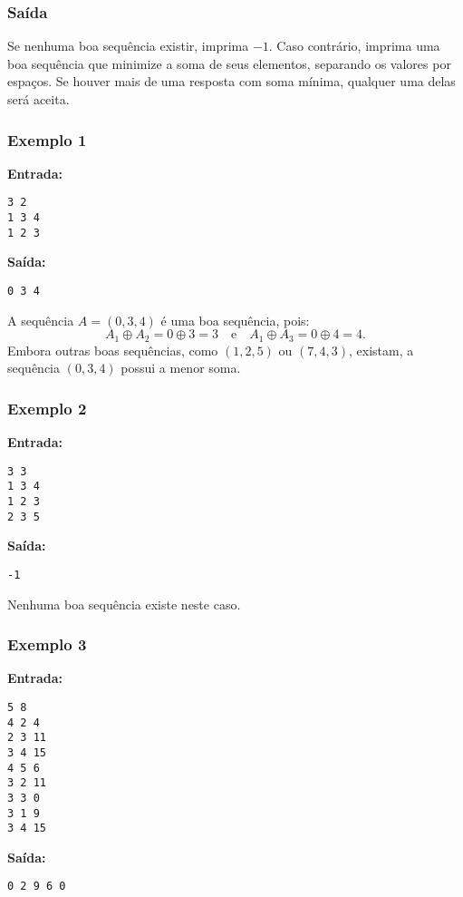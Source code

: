 \subsubsection*{Saída}
Se nenhuma boa sequência existir, imprima \(-1\). Caso contrário, imprima uma boa sequência que minimize a soma de seus elementos, separando os valores por espaços. Se houver mais de uma resposta com soma mínima, qualquer uma delas será aceita.

\subsubsection*{Exemplo 1}
\textbf{Entrada:}
\begin{verbatim}
3 2
1 3 4
1 2 3
\end{verbatim}
\textbf{Saída:}
\begin{verbatim}
0 3 4
\end{verbatim}

A sequência \(A = (0, 3, 4)\) é uma boa sequência, pois:
\[
A_1 \oplus A_2 = 0 \oplus 3 = 3 \quad \text{e} \quad A_1 \oplus A_3 = 0 \oplus 4 = 4.
\]
Embora outras boas sequências, como \((1,2,5)\) ou \((7,4,3)\), existam, a sequência \((0,3,4)\) possui a menor soma.

\subsubsection*{Exemplo 2}
\textbf{Entrada:}
\begin{verbatim}
3 3
1 3 4
1 2 3
2 3 5
\end{verbatim}
\textbf{Saída:}
\begin{verbatim}
-1
\end{verbatim}

Nenhuma boa sequência existe neste caso.

\subsubsection*{Exemplo 3}
\textbf{Entrada:}
\begin{verbatim}
5 8
4 2 4
2 3 11
3 4 15
4 5 6
3 2 11
3 3 0
3 1 9
3 4 15
\end{verbatim}
\textbf{Saída:}
\begin{verbatim}
0 2 9 6 0
\end{verbatim}

